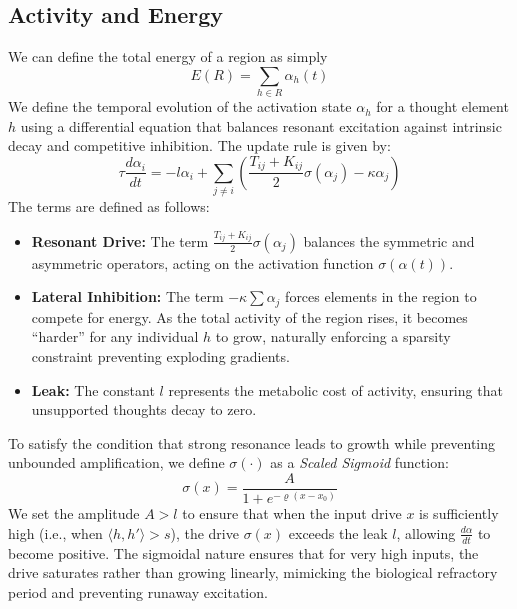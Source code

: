 \documentclass[twocolumn, 10pt]{article}
\begin{document}
\subsection{Activity and Energy}
We can define the total energy of a region as simply 
\begin{equation}
    E(R) = \sum_{h \in R} \alpha_h(t)
\end{equation}
We define the temporal evolution of the activation state $\alpha_h$ for a thought element $h$ using a differential equation that balances resonant excitation against intrinsic decay and competitive inhibition. The update rule is given by:
\begin{equation}
    \tau \frac{d \alpha_i}{dt} = -l\alpha_i + \sum_{j\ne i} \left( \frac{T_{ij} + K_{ij}}{2}\sigma(\alpha_j) - \kappa\alpha_j \right)
\end{equation}
The terms are defined as follows:
\begin{itemize}
    \item \textbf{Resonant Drive:} The term $\frac{T_{ij} + K_{ij}}{2}\sigma(\alpha_j)$ balances the symmetric and asymmetric operators, acting on the activation function $\sigma(\alpha(t))$. 
    \item \textbf{Lateral Inhibition:} The term $-\kappa \sum \alpha_j$ forces elements in the region to compete for energy. As the total activity of the region rises, it becomes ``harder'' for any individual $h$ to grow, naturally enforcing a sparsity constraint preventing exploding gradients.
    \item \textbf{Leak:} The constant $l$ represents the metabolic cost of activity, ensuring that unsupported thoughts decay to zero.
\end{itemize}

To satisfy the condition that strong resonance leads to growth while preventing unbounded amplification, we define $\sigma(\cdot)$ as a \textit{Scaled Sigmoid} function:
\begin{equation}
    \sigma(x) = \frac{A}{1 + e^{-\varrho(x - x_0)}}
\end{equation}
We set the amplitude $A > l$ to ensure that when the input drive $x$ is sufficiently high (i.e., when $\langle h, h' \rangle > s$), the drive $\sigma(x)$ exceeds the leak $l$, allowing $\frac{d\alpha}{dt}$ to become positive. The sigmoidal nature ensures that for very high inputs, the drive saturates rather than growing linearly, mimicking the biological refractory period and preventing runaway excitation. \\
\end{document}
